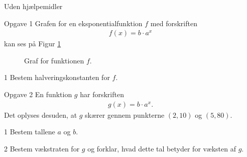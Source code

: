\begin{center}
	\LARGE
	Uden hjælpemidler
\end{center}
\begin{opgavetekst}{Opgave 1}
	Grafen for en eksponentialfunktion $f$ med forskriften
	\begin{align*}
		f(x) = b\cdot a^x
	\end{align*}
	kan ses på Figur \ref{fig:expgraf}
	\begin{figure}[H]
		\centering
		\caption{Graf for funktionen $f$.}
		\label{fig:expgraf}
	\end{figure}
	\phantom{h}
\end{opgavetekst}
\begin{delopgave}{1}
	Bestem halveringskonstanten for $f$.  
\end{delopgave}
%
%
%
%
%
%
\begin{opgavetekst}{Opgave 2}
	En funktion $g$ har forskriften
	\begin{align*}
		g(x) = b\cdot a^x.
	\end{align*}
	Det oplyses desuden, at $g$ skærer gennem punkterne $(2,10)$ og $(5,80)$. 
\end{opgavetekst}
\begin{delopgave}{1}
	Bestem tallene $a$ og $b$. 
\end{delopgave}
\begin{delopgave}{2}
	Bestem vækstraten for $g$ og forklar, hvad dette tal betyder for væksten af $g$. 
\end{delopgave}
%
%
%
%
%

